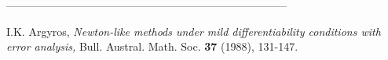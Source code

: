 \documentclass[10pt,a4paper]{article}
\begin{document}
\begin{center}
 -----------------------------------------------------------------------------
\end{center}
\begin{multicols}{2}
\begin{list}{}{\setlength{\topsep}{0mm}\setlength{\itemsep}{0mm}%
\setlength{\parsep}{0mm}\setlength{\leftmargin}{4mm}}
%
\small
\item[1.] I.K. Argyros, \textit{Newton-like methods under mild \linebreak differentiability conditions with error analysis,} Bull. \linebreak Austral. Math. Soc. \textbf{37} (1988), 131-147.
\item[2.] 
%
\end{list}
\end{multicols}
\end{document}
